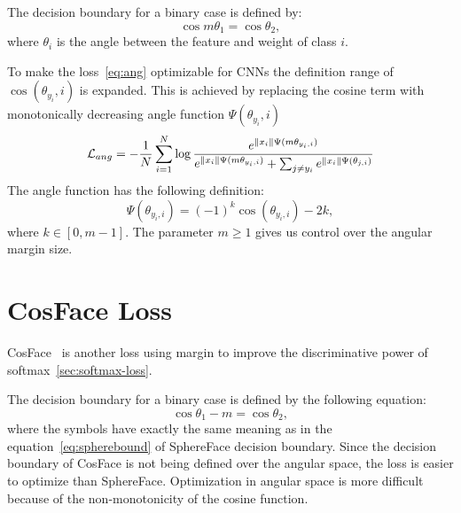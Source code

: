 The decision boundary for a binary case is defined by:
\begin{equation}
    \label{eq:spherebound}
    \cos{m\theta_1} = \cos{\theta_2},
\end{equation}
where $\theta_i$ is the angle between the feature and weight of class $i$.

To make the loss~\ref{eq:ang} optimizable for CNNs the definition range of $\cos(\theta_{y_i},i)$ is expanded.
This is achieved by replacing the cosine term with monotonically decreasing angle function $\Psi(\theta_{y_i},i)$
\begin{equation}
    \mathcal{L}_{ang} = -\frac{1}{N} \sum_{i=1}^{N} \log \frac{e^{\left\lVert x_i\right\rVert \Psi(m\theta_{y_i,i})}}
    {e^{\left\lVert x_i\right\rVert \Psi(m\theta_{y_i,i})} + \sum_{j \neq y_i} e^{\left\lVert x_{i}\right\rVert \Psi(\theta_{j,i})}}
\end{equation}
The angle function has the following definition:
\begin{equation}
    \Psi(\theta_{y_i,i}) = (-1)^{k} \cos(\theta_{y_{i},i}) -2k,
\end{equation}
where $k \in \left[ 0, m-1 \right]$.
The parameter $m \geq 1$ gives us control over the angular margin size.

\section{CosFace Loss}\label{sec:cosface}
CosFace~\cite{CosFace} is another loss using margin to improve the discriminative power of
softmax~\ref{sec:softmax-loss}.

The decision boundary for a binary case is defined by the following equation:
\begin{equation}
    \label{eq:cosbounary}
    \cos{\theta_1} - m = \cos{\theta_2},
\end{equation}
where the symbols have exactly the same meaning as in the equation~\ref{eq:spherebound} of SphereFace decision boundary.
Since the decision boundary of CosFace is not being defined over the angular space, the loss is easier to optimize than
SphereFace.
Optimization in angular space is more difficult because of the non-monotonicity of the cosine function.

